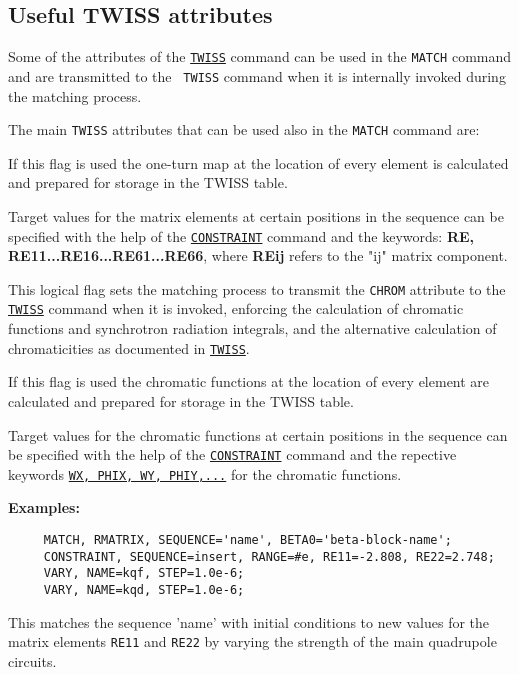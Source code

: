 \subsection{Useful TWISS attributes}

Some of the attributes of the \hyperref[chap:twiss]{\tt TWISS} command
can be used in the {\tt MATCH} command and are transmitted to the {\tt
  TWISS} command when it is internally invoked during the matching process. 

The main {\tt TWISS} attributes that can be used also in the {\tt MATCH}
command are:

\begin{madlist}
   If this flag is used the one-turn map at the location of every
  element is calculated and prepared for storage in the TWISS table.
 
  Target values for the matrix elements at certain positions in the
  sequence can be specified with the help of the
  \hyperref[sec:constraint]{\tt CONSTRAINT} command and the keywords:
  \textbf{RE, RE11...RE16...RE61...RE66}, where \textbf{REij} refers to
  the "ij" matrix component.
  

   This logical flag sets the matching process to transmit
  the {\tt CHROM} attribute to the \hyperref[chap:twiss]{\tt TWISS}
  command when it is invoked, enforcing the calculation of chromatic
  functions and synchrotron radiation integrals, and the alternative
  calculation of chromaticities as documented in
  \hyperref[chap:twiss]{\tt TWISS}.

  If this flag is used the chromatic functions at the location of
  every element are calculated and prepared for storage in the TWISS
  table. 
  
  Target values for the chromatic functions at certain positions in the
  sequence can be specified with the help of the
  \hyperref[sec:constraint]{\tt CONSTRAINT} command and the repective keywords
  \hyperref[subsec:tables_chrom]{\tt WX, PHIX, WY, PHIY,...} for the
  chromatic functions. 
\end{madlist}


{\bf  Examples:}

\begin{verbatim}
     MATCH, RMATRIX, SEQUENCE='name', BETA0='beta-block-name';
     CONSTRAINT, SEQUENCE=insert, RANGE=#e, RE11=-2.808, RE22=2.748;
     VARY, NAME=kqf, STEP=1.0e-6;
     VARY, NAME=kqd, STEP=1.0e-6;
\end{verbatim}

  This matches the sequence 'name' with initial conditions to new values
  for the matrix elements {\tt RE11} and {\tt RE22} by varying the
  strength of the main quadrupole circuits.

